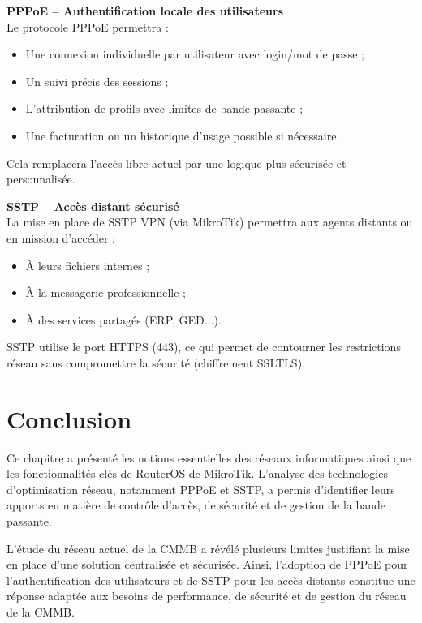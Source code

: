 \textbf{\gls{PPPoE} – Authentification locale des utilisateurs} \\
Le protocole \gls{PPPoE} permettra :
\begin{itemize}
    \item Une connexion individuelle par utilisateur avec login/mot de passe ;
    \item Un suivi précis des sessions ;
    \item L’attribution de profils avec limites de bande passante ;
    \item Une facturation ou un historique d’usage possible si nécessaire.
\end{itemize}

Cela remplacera l’accès libre actuel par une logique plus sécurisée et personnalisée.

\textbf{SSTP – Accès distant sécurisé} \\
La mise en place de \gls{SSTP} \gls{VPN} (via MikroTik) permettra aux agents distants ou en mission d’accéder :
\begin{itemize}
    \item À leurs fichiers internes ;
    \item À la messagerie professionnelle ;
    \item À des services partagés (\gls{ERP}, \gls{GED}...).
\end{itemize}

\gls{SSTP} utilise le port \gls{HTTPS} (443), ce qui permet de contourner les restrictions réseau sans compromettre la sécurité (chiffrement \gls{SSL}\/\gls{TLS}).



\section*{Conclusion}

Ce chapitre a présenté les notions essentielles des réseaux informatiques ainsi que les fonctionnalités clés de RouterOS de MikroTik. L’analyse des technologies d’optimisation réseau, notamment \gls{PPPoE} et \gls{SSTP}, a permis d’identifier leurs apports en matière de contrôle d’accès, de sécurité et de gestion de la bande passante. 

L’étude du réseau actuel de la \gls{CMMB} a révélé plusieurs limites justifiant la mise en place d’une solution centralisée et sécurisée. Ainsi, l’adoption de \gls{PPPoE} pour l’authentification des utilisateurs et de \gls{SSTP} pour les accès distants constitue une réponse adaptée aux besoins de performance, de sécurité et de gestion du réseau de la CMMB.